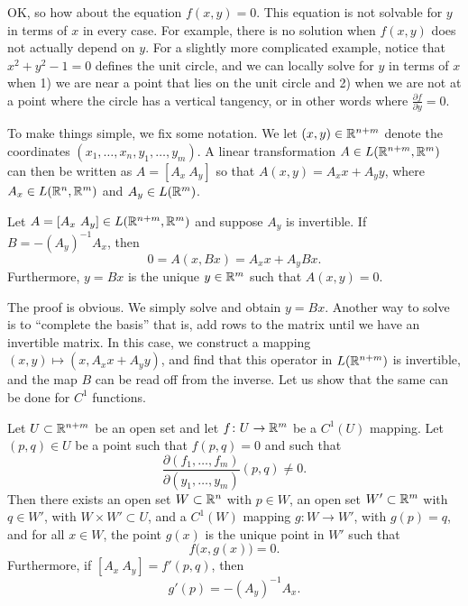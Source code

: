 OK, so how about the equation $f(x,y) = 0$.  This equation is
not solvable for $y$ in terms of $x$ in every case.  For example,
there is no solution
when $f(x,y)$ does not actually depend on $y$.  For a slightly more
complicated example, notice that $x^2+y^2-1 = 0$ defines the unit circle, and
we can locally solve for $y$ in terms of $x$ when 1) we are near
a point that lies on the unit circle and 2) when we are not at a point
where the circle has a vertical tangency, or in other words where
$\frac{\partial f}{\partial y} = 0$.

To make things simple, we fix some notation.  We let $(x,y) \in
{\mathbb{R}}^{n+m}$ denote the coordinates $(x_1,\ldots,x_n,y_1,\ldots,y_m)$.  A
linear transformation $A \in L({\mathbb{R}}^{n+m},{\mathbb{R}}^m)$ can then 
be written as
$A = [ A_x ~ A_y ]$ so that $A(x,y) = A_x x + A_y y$,
where $A_x \in L({\mathbb{R}}^n,{\mathbb{R}}^m)$ and
$A_y \in L({\mathbb{R}}^m)$.

\begin{prop}
Let $A = [A_x~A_y] \in L({\mathbb{R}}^{n+m},{\mathbb{R}}^m)$ and suppose 
$A_y$ is invertible.  If $B = - {(A_y)}^{-1} A_x$, then
\begin{equation*}
0 = A ( x, Bx) = A_x x + A_y Bx .
\end{equation*}
Furthermore, $y=Bx$ is the unique $y \in {\mathbb{R}}^m$ such that $A(x,y) = 0$.
\end{prop}

The proof is obvious.  We simply solve and obtain $y = Bx$.
Another way to solve is to ``complete the basis'' that is, add
rows to the matrix until we have an invertible matrix.  In this case,
we construct a mapping $(x,y) \mapsto (x,A_x x + A_y y)$, and
find that this operator in $L({\mathbb{R}}^{n+m})$ is invertible, and the map $B$
can be read off from the inverse.
Let us show that the same can be done for $C^1$ functions.

\begin{thm}
\label{thm:implicit}
Let $U \subset {\mathbb{R}}^{n+m}$ be an open set and let $f \colon U \to {\mathbb{R}}^m$
be a $C^1(U)$ mapping.  Let $(p,q) \in U$ be a point such that
$f(p,q) = 0$ and such that
\begin{equation*}
\frac{\partial(f_1,\ldots,f_m)}{\partial(y_1,\ldots,y_m)} (p,q)  \neq 0 .
\end{equation*}
Then there exists an
open set $W \subset {\mathbb{R}}^n$ with $p \in W$,
an open set $W' \subset {\mathbb{R}}^m$ with $q \in W'$,
with $W \times W' \subset U$,
and
a $C^1(W)$ mapping $g \colon W \to W'$, with $g(p) = q$, and
for all $x \in W$, the point $g(x)$ is the unique point in $W'$
such that 
\begin{equation*}
f\bigl(x,g(x)\bigr) = 0 .
\end{equation*}
Furthermore, if $[ A_x ~ A_y ] = f'(p,q)$, then
\begin{equation*}
g'(p) = -{(A_y)}^{-1}A_x .
\end{equation*}
\end{thm}

